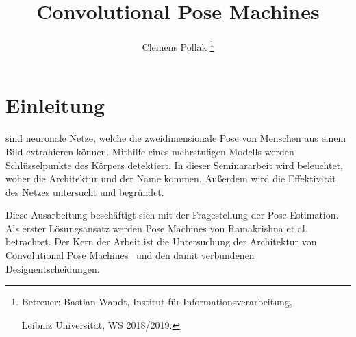 \documentclass[journal, a4paper]{IEEEtran}
\begin{document}
	\title{Convolutional Pose Machines}
	\author{Clemens Pollak
	\thanks{Betreuer: Bastian Wandt, Institut f\"ur Informations­verarbeitung,

         Leibniz Universit\"at, WS 2018/2019.}}
	\maketitle

\section{Einleitung}
	 sind neuronale Netze, welche die zweidimensionale Pose von Menschen aus einem Bild extrahieren können. Mithilfe eines mehrstufigen Modells werden Schlüsselpunkte des Körpers detektiert. In dieser Seminararbeit wird beleuchtet, woher die Architektur und der Name kommen. Außerdem wird die Effektivität des Netzes untersucht und begründet.

        Diese Ausarbeitung beschäftigt sich mit der Fragestellung der Pose Estimation. Als erster Lösungsansatz werden Pose Machines von Ramakrishna et al.~\cite{ramakrishna2014pose} betrachtet. Der Kern der Arbeit ist die Untersuchung der Architektur von Convolutional Pose Machines~\cite{conv_pose} und den damit verbundenen Designentscheidungen.
\end{document}
